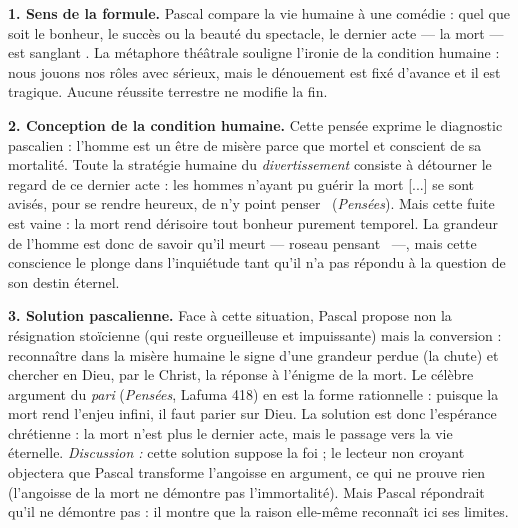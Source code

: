 \documentclass[11pt]{article}
\newcommand{\cle}[1]{{\popxbold\color{popdark}#1}}
\begin{document}
\begin{corrige}
\textbf{1. Sens de la formule.} Pascal compare la vie humaine à une comédie : quel que soit le bonheur, le succès ou la beauté du spectacle, le dernier acte — la mort — est \guillemotleft sanglant \guillemotright. La métaphore théâtrale souligne l'ironie de la condition humaine : nous jouons nos rôles avec sérieux, mais le dénouement est fixé d'avance et il est tragique. Aucune réussite terrestre ne modifie la fin.

\textbf{2. Conception de la condition humaine.} Cette pensée exprime le diagnostic pascalien : l'homme est un être de \cle{misère} parce que mortel et conscient de sa mortalité. Toute la stratégie humaine du \emph{divertissement} consiste à détourner le regard de ce dernier acte : \guillemotleft les hommes n'ayant pu guérir la mort [...] se sont avisés, pour se rendre heureux, de n'y point penser \guillemotright\ (\emph{Pensées}). Mais cette fuite est vaine : la mort rend dérisoire tout bonheur purement temporel. La grandeur de l'homme est donc de savoir qu'il meurt — \guillemotleft roseau pensant \guillemotright\ —, mais cette conscience le plonge dans l'inquiétude tant qu'il n'a pas répondu à la question de son destin éternel.

\textbf{3. Solution pascalienne.} Face à cette situation, Pascal propose non la résignation stoïcienne (qui reste orgueilleuse et impuissante) mais la conversion : reconnaître dans la misère humaine le signe d'une grandeur perdue (la chute) et chercher en Dieu, par le Christ, la réponse à l'énigme de la mort. Le célèbre argument du \emph{pari} (\emph{Pensées}, Lafuma 418) en est la forme rationnelle : puisque la mort rend l'enjeu infini, il faut parier sur Dieu. La solution est donc l'\cle{espérance} chrétienne : la mort n'est plus le dernier acte, mais le passage vers la vie éternelle. \emph{Discussion :} cette solution suppose la foi ; le lecteur non croyant objectera que Pascal transforme l'angoisse en argument, ce qui ne prouve rien (l'angoisse de la mort ne démontre pas l'immortalité). Mais Pascal répondrait qu'il ne démontre pas : il montre que la raison elle-même reconnaît ici ses limites.
\end{corrige}
\end{document}
